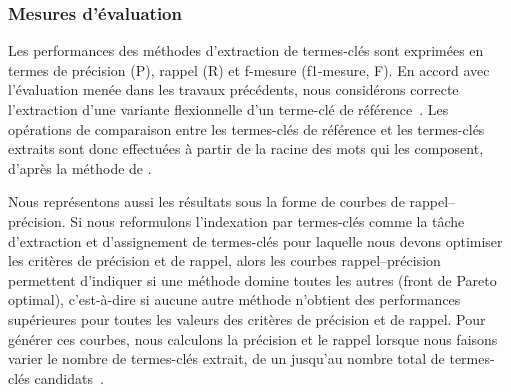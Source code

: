       \subsubsection{Mesures d'évaluation}
      \label{subsubsec:main-automatic_keyphrase_annotation-supervised_automatic_keyphrase_annotation-evaluation-evaluation_measures}
        Les performances des méthodes d'extraction de termes-clés sont exprimées
        en termes de précision (P), rappel (R) et f-mesure (f1-mesure, F). En
        accord avec l'évaluation menée dans les travaux précédents, nous
        considérons correcte l'extraction d'une variante flexionnelle d'un
        terme-clé de référence~\cite{kim2010semeval}. Les opérations de
        comparaison entre les termes-clés de référence et les termes-clés
        extraits sont donc effectuées à partir de la racine des mots qui les
        composent, d'après la méthode de .

        Nous représentons aussi les résultats sous la forme de courbes de
        rappel--précision. Si nous reformulons l'indexation par termes-clés
        comme la tâche d'extraction et d'assignement de termes-clés pour
        laquelle nous devons optimiser les critères de précision et de rappel,
        alors les courbes rappel--précision permettent d'indiquer si une méthode
        domine toutes les autres (front de Pareto optimal), c'est-à-dire si
        aucune autre méthode n'obtient des performances supérieures pour toutes
        les valeurs des critères de précision et de rappel. Pour générer ces
        courbes, nous calculons la précision et le rappel lorsque nous faisons
        varier le nombre de termes-clés extrait, de un jusqu'au nombre total de
        termes-clés candidats~\cite{hassan2010conundrums}.
      
